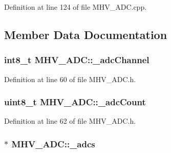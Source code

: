\-Definition at line 124 of file \-M\-H\-V\-\_\-\-A\-D\-C.\-cpp.



\subsection{\-Member \-Data \-Documentation}
\hypertarget{class_m_h_v___a_d_c_ac37e4bbff5ab56cf804ccbdaa438dab3}{
\subsubsection[{\-\_\-adc\-Channel}]{\setlength{\rightskip}{0pt plus 5cm}int8\-\_\-t {\bf \-M\-H\-V\-\_\-\-A\-D\-C\-::\-\_\-adc\-Channel}}}
\label{class_m_h_v___a_d_c_ac37e4bbff5ab56cf804ccbdaa438dab3}


\-Definition at line 60 of file \-M\-H\-V\-\_\-\-A\-D\-C.\-h.

\hypertarget{class_m_h_v___a_d_c_acfc87dc2be1e01a43b8cb0a1dbfde7e8}{
\subsubsection[{\-\_\-adc\-Count}]{\setlength{\rightskip}{0pt plus 5cm}uint8\-\_\-t {\bf \-M\-H\-V\-\_\-\-A\-D\-C\-::\-\_\-adc\-Count}}}
\label{class_m_h_v___a_d_c_acfc87dc2be1e01a43b8cb0a1dbfde7e8}


\-Definition at line 62 of file \-M\-H\-V\-\_\-\-A\-D\-C.\-h.

\hypertarget{class_m_h_v___a_d_c_a6033f6790dd0a65e88d5a04fc01daaac}{
\subsubsection[{\-\_\-adcs}]{$\ast$ {\bf \-M\-H\-V\-\_\-\-A\-D\-C\-::\-\_\-adcs}}}
\label{class_m_h_v___a_d_c_a6033f6790dd0a65e88d5a04fc01daaac}


